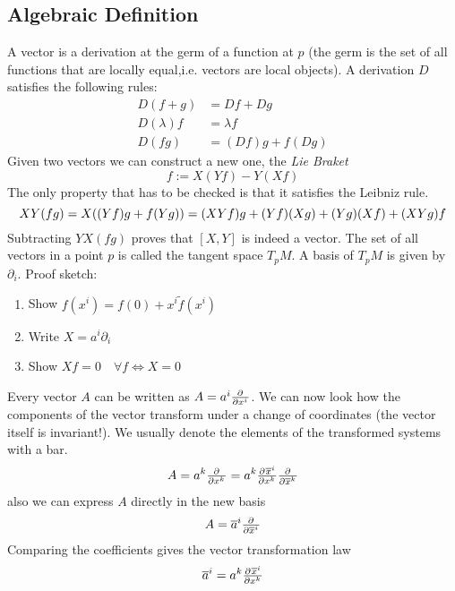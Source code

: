\subsection*{Algebraic Definition}
A vector is a derivation at the germ of a function at $p$ 
(the germ is the set of all functions that are locally equal,i.e. vectors are local objects). 
A derivation $D$ satisfies the following rules:
\begin{align*}
    D(f+g) &=Df+Dg\\
    D(\lambda)f&=\lambda f\\
    D(fg)&= (Df)g+f(Dg)
\end{align*}
Given two vectors we can construct a new one, the \emph{Lie Braket}
\begin{equation}
    [X,Y]f:=X(Yf)-Y(Xf)
\end{equation}
The only property that has to be checked is that it satisfies the Leibniz rule.
\begin{equation*}
    XY(fg)=X((Yf)g+f(Yg))=(XYf)g+(Yf)(Xg)+(Yg)(Xf)+(XYg)f\\
\end{equation*}
Subtracting $YX(fg)$ proves that $[X,Y]$ is indeed a vector.
The set of all vectors in a point $p$ is called the tangent space $T_pM$. A basis of $T_pM$ is given by $\partial_i$.
Proof sketch:
\begin{enumerate}
    \item Show $f(x^i)=f(0)+x^i\tilde{f}(x^i)$
    \item Write $X=a^i\partial_i$
    \item Show $Xf=0\quad \forall f \iff X=0$
\end{enumerate}
Every vector $A$ can be written as $A=a^i\pd{}{{x^i}}$. We can now look how the components of the vector transform 
under a change of coordinates (the vector itself is invariant!). We usually denote the elements of the transformed systems with a bar.
\begin{equation}
    A= a^k\pd{}{{x^k}}= a^k\pd{\overline{x}^i}{{x^k}}\pd{}{{\overline{x}^k}}
\end{equation}
also we can express $A$ directly in the new basis
\begin{equation}
    A= \overline{a}^i\pd{}{{\overline{x}^i}}
\end{equation}
Comparing the coefficients gives the vector transformation law
\begin{equation}
    \overline{a}^i=a^k\pd{\overline{x}^i}{{x^k}}\label{eq:coefftrafo}
\end{equation}
